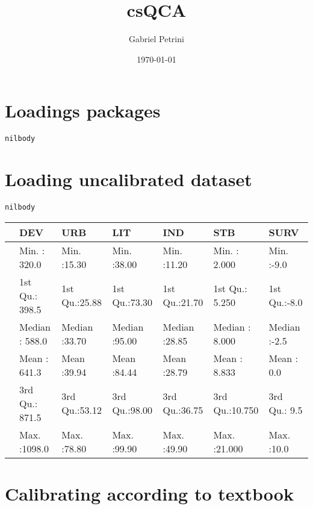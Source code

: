 \documentclass[11pt]{article}
\author{Gabriel Petrini}
\date{\today}
\title{csQCA}
\begin{document}
\maketitle
\tableofcontents

\section*{Loadings packages}
\label{sec:org6fffd51}

\begin{verbatim}
nilbody
\end{verbatim}

\section*{Loading uncalibrated dataset}
\label{sec:org7bb0c95}

\begin{verbatim}
nilbody
\end{verbatim}


\begin{tabular}{l|l|l|l|l|l|l}
\hline
  &      DEV &      URB &      LIT &      IND &      STB &      SURV\\
\hline
 & Min.   : 320.0 & Min.   :15.30 & Min.   :38.00 & Min.   :11.20 & Min.   : 2.000 & Min.   :-9.0\\
\hline
 & 1st Qu.: 398.5 & 1st Qu.:25.88 & 1st Qu.:73.30 & 1st Qu.:21.70 & 1st Qu.: 5.250 & 1st Qu.:-8.0\\
\hline
 & Median : 588.0 & Median :33.70 & Median :95.00 & Median :28.85 & Median : 8.000 & Median :-2.5\\
\hline
 & Mean   : 641.3 & Mean   :39.94 & Mean   :84.44 & Mean   :28.79 & Mean   : 8.833 & Mean   : 0.0\\
\hline
 & 3rd Qu.: 871.5 & 3rd Qu.:53.12 & 3rd Qu.:98.00 & 3rd Qu.:36.75 & 3rd Qu.:10.750 & 3rd Qu.: 9.5\\
\hline
 & Max.   :1098.0 & Max.   :78.80 & Max.   :99.90 & Max.   :49.90 & Max.   :21.000 & Max.   :10.0\\
\hline
\end{tabular}

\section*{Calibrating according to textbook}
\label{sec:org8a0388c}
\end{document}
